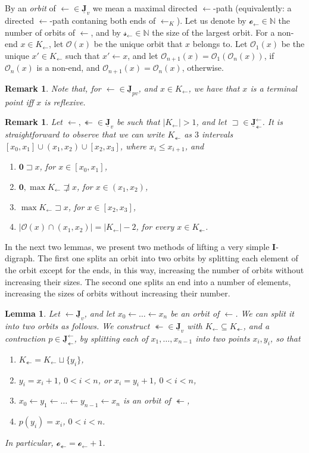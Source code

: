 \documentclass[12pt]{amsart}
\numberwithin{equation}{section}
\theoremstyle{plain}
\newtheorem{lemma}[theorem]{Lemma}
\newtheorem{remark}[theorem]{\bf Remark}
\theoremstyle{definition}
\newcommand \sqsp{\sqsupset}
\newcommand \la{\leftarrow}
\newcommand \tla{\twoheadleftarrow}
\newcommand \rt{\mathbf{0}}
\newcommand \IIb{\mathbf{I}}
\newcommand \JJub{\underline{\mathbf{J}}}
\newcommand \OO{\mathcal{O}}
\newcommand \oo{\mathcal{o}}
\newcommand \sss{\mathcal{s}}
\newcommand \NN{\mathbb{N}}
\begin{document}
By an \emph{orbit} of $\leftarrow \in \JJub_v$ we mean a maximal directed $\la$-path (equivalently: a directed $\la$-path contaning both ends of $\la_K$). Let us denote by $\oo_\leftarrow \in \NN$ the number of orbits of $\leftarrow$, and by $\sss_\leftarrow \in \NN$ the size of the largest orbit.  For a non-end $x \in K_\la$, let $\OO(x)$ be the unique orbit that $x$ belongs to. Let $\OO_1(x)$ be the unique $x' \in K_\la$ such that $x' \la x$, and let $\OO_{n+1}(x)=\OO_1(\OO_n(x))$, if $\OO_n(x)$ is a non-end, and  $\OO_{n+1}(x)=\OO_n(x)$, otherwise.

\begin{remark}
\label{re:TerminalReflexive}
Note that, for $\la \in \JJub_{pv}$, and $x \in K_\la$, we have that $x$ is a terminal point iff $x$ is reflexive.
\end{remark}


\begin{remark}
\label{re:RGBArc}
Let $\la,\tla \in \JJub_v$ be such that $|K_\la|>1$, and let $\sqsp \in \JJub^\la_\tla$. It is straightforward to observe that we can write $K_\tla$ as $3$ intervals $[x_0,x_1] \cup (x_1, x_2) \cup [x_2,x_3]$, where $x_i \leq x_{i+1}$, and
%
\begin{enumerate}
	\item $\rt \sqsp x$, for $x \in [x_0,x_1]$,
	 \item $\rt, \max K_\la  \not \sqsp x$, for $x \in (x_1,x_2)$,
	 \item $\max K_\la \sqsp x$, for $x \in [x_2,x_3]$,
	 \item $|\OO(x) \cap (x_1,x_2)|=|K_\la|-2$, for every $x \in K_\tla$.
\end{enumerate}  
\end{remark}

In the next two lemmas, we present two methods of lifting a very simple $\IIb$-digraph. The first one splits an orbit into two orbits by splitting each element of the orbit except for the ends, in this way, increasing the number of orbits without increasing their sizes. The second one splits an end into a number of elements, increasing the sizes of orbits without increasing their number. 

\begin{lemma}
\label{le:SplitOrbit}
Let $\la \JJub_v$, and let $x_0 \la \ldots \la x_n$ be an orbit of $\la$. We can split it into two orbits as follows. We construct $\tla \in \JJub_v$ with $K_\la \subseteq K_\tla$, and a  contraction $p \in \JJub^\la_\tla$, by splitting each of $x_1, \ldots, x_{n-1}$ into two points $x_i, y_i$, so that
%
\begin{enumerate}
\item $K_\tla=K_\la \sqcup \{y_i\}$,
\item $y_i=x_i+1$, $0<i<n$, or $x_i=y_i+1$, $0< i<n$,
\item $x_0 \la y_1 \la \ldots \la y_{n-1} \la  x_n$ is an orbit of $\tla$,
\item $p(y_i)=x_i$, $0<i <n$.
\end{enumerate}
%
In particular, $\oo_\tla=\oo_\la+1$.
\end{lemma}
\end{document}
